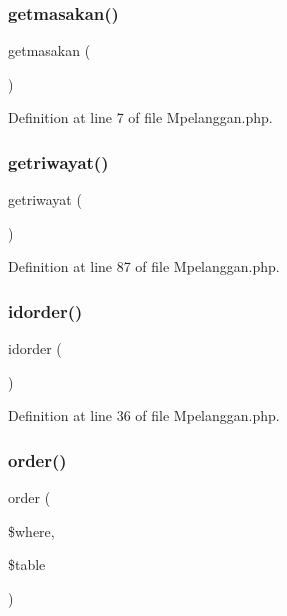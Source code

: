 \subsubsection{\texorpdfstring{getmasakan()}{getmasakan()}}
{\footnotesize\ttfamily getmasakan (\begin{DoxyParamCaption}{ }\end{DoxyParamCaption})}



Definition at line 7 of file Mpelanggan.\+php.

\mbox{\label{class_mpelanggan_aff459bbf030d5ab3dc311ab077349371}} 
\subsubsection{\texorpdfstring{getriwayat()}{getriwayat()}}
{\footnotesize\ttfamily getriwayat (\begin{DoxyParamCaption}{ }\end{DoxyParamCaption})}



Definition at line 87 of file Mpelanggan.\+php.

\mbox{\label{class_mpelanggan_a609d55790b70e6c172ee10588e0c8453}} 
\subsubsection{\texorpdfstring{idorder()}{idorder()}}
{\footnotesize\ttfamily idorder (\begin{DoxyParamCaption}{ }\end{DoxyParamCaption})}



Definition at line 36 of file Mpelanggan.\+php.

\mbox{\label{class_mpelanggan_a4fbd9d3452149bf51f6f9549a72baa3e}} 
\subsubsection{\texorpdfstring{order()}{order()}}
{\footnotesize\ttfamily order (\begin{DoxyParamCaption}\item[{}]{\$where,  }\item[{}]{\$table }\end{DoxyParamCaption})}




